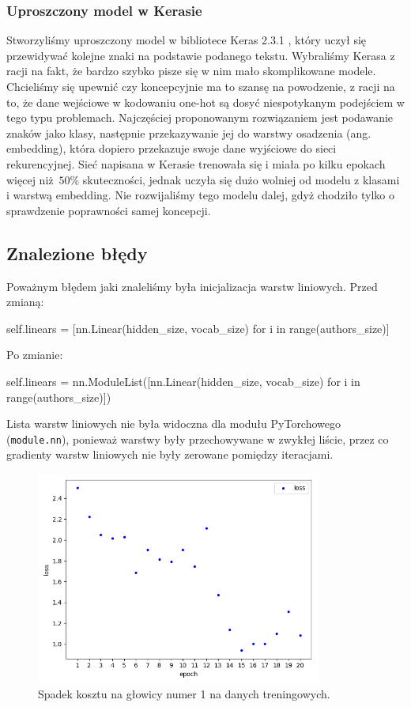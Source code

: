 \subsubsection{Uproszczony model w Kerasie}
Stworzyliśmy uproszczony model w bibliotece Keras 2.3.1 \cite{keras}, który uczył się przewidywać kolejne znaki na podstawie podanego tekstu.
Wybraliśmy Kerasa z racji na fakt, że bardzo szybko pisze się w nim mało skomplikowane modele.
Chcieliśmy się upewnić czy koncepcyjnie ma to szansę na powodzenie, z racji na to, że dane wejściowe w kodowaniu one-hot
są dosyć niespotykanym podejściem w tego typu problemach. Najczęściej proponowanym rozwiązaniem jest podawanie znaków jako klasy, następnie
przekazywanie jej do warstwy osadzenia (ang. embedding), która dopiero przekazuje swoje dane wyjściowe do sieci rekurencyjnej.
Sieć napisana w Kerasie trenowała się i miała po kilku epokach więcej niż $50\%$ skuteczności, jednak uczyła się
dużo wolniej od modelu z klasami i warstwą embedding. Nie rozwijaliśmy tego modelu dalej, gdyż chodziło tylko o sprawdzenie poprawności samej koncepcji.

\newpage
\subsection{Znalezione błędy}
Poważnym błędem jaki znaleliśmy była inicjalizacja warstw liniowych.
Przed zmianą:
\begin{python}
self.linears = [nn.Linear(hidden_size, vocab_size) for i in range(authors_size)]

\end{python}
Po zmianie:
\begin{python}
self.linears = nn.ModuleList([nn.Linear(hidden_size, vocab_size) for i in range(authors_size)])

\end{python}

Lista warstw liniowych nie była widoczna dla modułu PyTorchowego (\texttt{module.nn}), ponieważ warstwy były przechowywane
w zwykłej liście, przez co gradienty warstw liniowych nie były zerowane pomiędzy iteracjami.

\begin{figure}[H]
	\centering
	\includegraphics[height=7cm]{./images/loss_decrease.png}
	\caption{Spadek kosztu na głowicy numer 1 na danych treningowych.}
	\label{fig:test5}
\end{figure}

